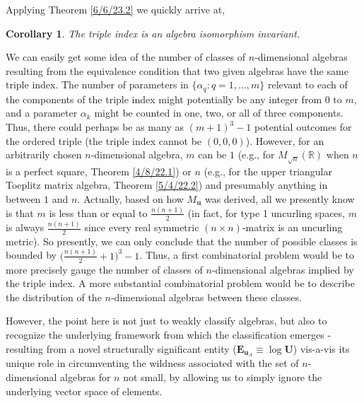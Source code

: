 \documentclass{amsart}
\numberwithin{equation}{section}
\newtheorem{corollary}[theorem]{Corollary}
\theoremstyle{definition}
\numberwithin{theorem}{section}
\begin{document}
Applying Theorem \ref{6/6/23.2} we quickly arrive at,   

\begin{corollary} \label{6/6/23.3} The triple index is an algebra isomorphism invariant.
\end{corollary}

We can easily get some idea of the number of classes of $n$-dimensional algebras resulting from the equivalence condition that two given algebras have the same triple index.  The number of parameters in $\{\alpha_q: q=1,\dots,m\}$ relevant to each of the components of the triple index might potentially be any integer from 0 to $m$, and a parameter $\alpha_k$ might be counted in one, two, or all of three components.   Thus, there could perhaps be as many as $(m+1)^3-1$ potential outcomes for the ordered triple (the triple index cannot be $(0,0,0)$).  However, for an arbitrarily chosen \mbox{$n$-dimensional} algebra, $m$ can be $1$ (e.g., for $M_{\sqrt{n}}(\mathbb{R})$ when $n$ is a perfect square, Theorem \ref{4/8/22.1}) or $n$ (e.g., for the upper triangular Toeplitz matrix algebra, Theorem \ref{5/4/22.2}) and presumably anything in between $1$ and $n$.  Actually,  based on how $M_{\mathbf{u}}$ was derived, all we presently know is that $m$ is less than or equal to $\frac{n(n+1)}{2}$ (in fact, for type 1 uncurling spaces, $m$ is always $\frac{n(n+1)}{2}$ since every real symmetric $(n\times n)$-matrix is an uncurling metric).  So presently, we can only conclude that the number of possible classes is bounded by  $\big(\frac{n(n+1)}{2}+1\big)^3-1$.   Thus, a first combinatorial problem would be to more precisely gauge the number of classes of $n$-dimensional algebras implied by the triple index.  A more substantial combinatorial problem would be to describe the distribution of the $n$-dimensional algebras between these classes.
  
   However, the point here is not just to weakly classify algebras, but also to recognize the underlying framework from which the classification emerges - resulting from a novel structurally significant entity ($\mathbf{E}_{\mathbf{u}_A}\equiv\log\mathbf{U}$) vis-a-vis its unique role in circumventing the wildness associated with the set of $n$-dimensional algebras for $n$ not small, by allowing us to simply ignore the underlying vector space of elements.
\end{document}
